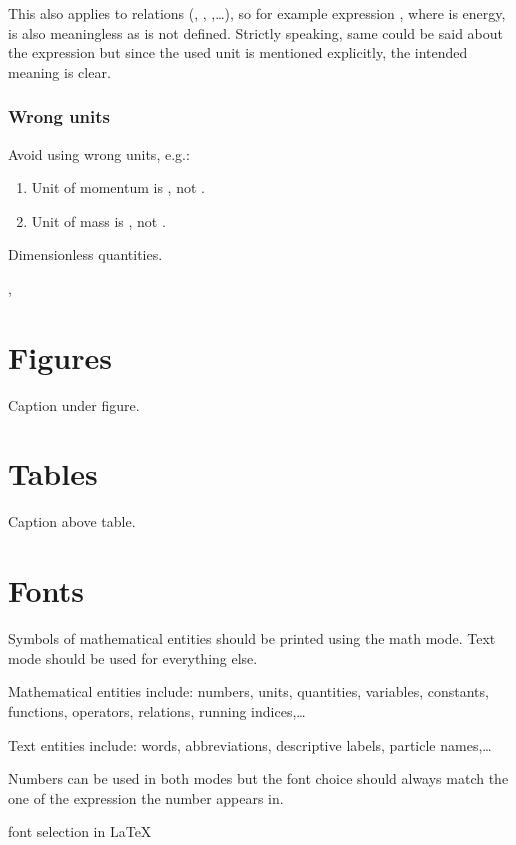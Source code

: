 \documentclass[12pt,a4paper]{article}
\begin{document}
This also applies to relations (\ml{=}, \ml{<}, \ml{>},\ldots), so for example expression , where  is energy, is also meaningless as  is not defined.
Strictly speaking, same could be said about the expression  but since the used unit is mentioned explicitly, the intended meaning is clear.

\subsubsection{Wrong units}

Avoid using wrong units, e.g.:
\begin{enumerate}
    \item Unit of momentum is \si{\gevc}, not \si{\gev}.
    \item Unit of mass is \si{\gevcc}, not \si{\gev}.
\end{enumerate}

Dimensionless quantities.

, 

\section{Figures}

Caption under figure.


\section{Tables}

Caption above table.


\section{Fonts}

Symbols of mathematical entities should be printed using the math mode.
Text mode should be used for everything else.

Mathematical entities include: numbers, units, quantities, variables, constants, functions, operators, relations, running indices,\ldots

Text entities include: words, abbreviations, descriptive labels, particle names,\ldots

Numbers can be used in both modes but the font choice should always match the one of the expression the number appears in.

font selection in \LaTeX{}
\end{document}
